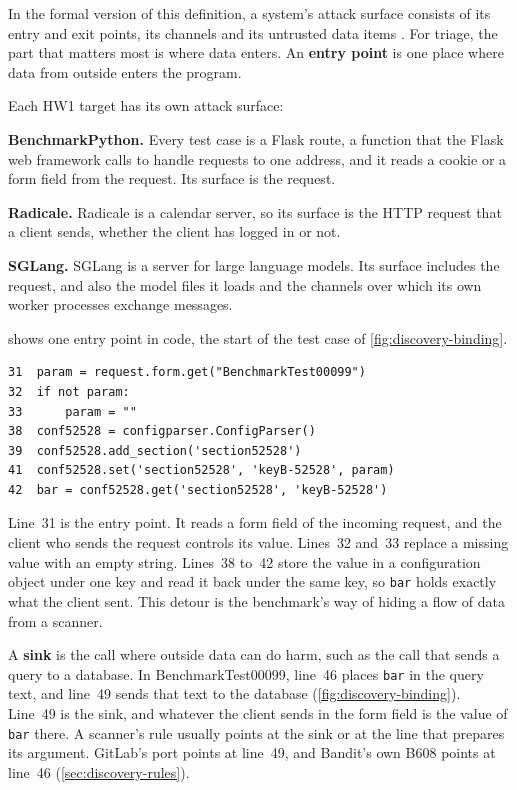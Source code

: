 In the formal version of this definition, a system's attack surface consists of its entry and exit
points, its channels and its untrusted data items \citep{manadhata2011attack}. For triage, the part
that matters most is where data enters. An \textbf{entry point} is one place where data from outside
enters the program.

Each HW1 target has its own attack surface:
\bi
\item \textbf{BenchmarkPython.} Every test case is a Flask route, a function that the Flask web
framework calls to handle requests to one address, and it reads a cookie or a form field from the
request. Its surface is the request.
\item \textbf{Radicale.} Radicale is a calendar server, so its surface is the HTTP request that a
client sends, whether the client has logged in or not.
\item \textbf{SGLang.} SGLang is a server for large language models. Its surface includes the
request, and also the model files it loads and the channels over which its own worker processes
exchange messages.
\ei

 shows one entry point in code, the start of the test case of
\cref{fig:discovery-binding}.

\begin{lstlisting}[basicstyle=\ttfamily\footnotesize, caption={The entry point of the test case BenchmarkTest00099 and the path of its value to \texttt{bar} (lines 31 to 42, with lines 34 to 37 and 40 left out).}, label=lst:discovery-entry]
31  param = request.form.get("BenchmarkTest00099")
32  if not param:
33      param = ""
38  conf52528 = configparser.ConfigParser()
39  conf52528.add_section('section52528')
41  conf52528.set('section52528', 'keyB-52528', param)
42  bar = conf52528.get('section52528', 'keyB-52528')
\end{lstlisting}

Line~31 is the entry point. It reads a form field of the incoming request, and the client who sends
the request controls its value. Lines~32 and~33 replace a missing value with an empty string.
Lines~38 to~42 store the value in a configuration object under one key and read it back under the
same key, so \texttt{bar} holds exactly what the client sent. This detour is the benchmark's way of
hiding a flow of data from a scanner.

A \textbf{sink} is the call where outside data can do harm, such as the call that sends a query to a
database. In BenchmarkTest00099, line~46 places \texttt{bar} in the query text, and line~49 sends
that text to the database (\cref{fig:discovery-binding}). Line~49 is the sink, and whatever the
client sends in the form field is the value of \texttt{bar} there. A scanner's rule usually points
at the sink or at the line that prepares its argument. GitLab's port points at line~49, and
Bandit's own B608 points at line~46 (\cref{sec:discovery-rules}).

